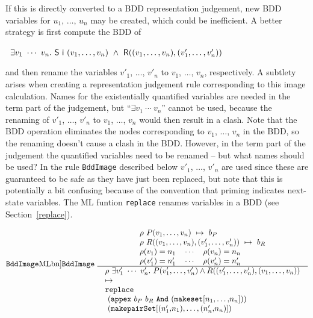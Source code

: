 \documentclass[12pt]{article}
\newcommand{\bnind}[1]{\index[MLbn]{#1}}
\newcommand{\con}[1]{\mbox{\sf #1}}
\newcommand{\ml}[1]{{\tt #1}}
\newcommand{\termbdd}[3]{\mbox{$#1~#2~\mapsto~#3$}}
\begin{document}
\smallskip

If this is directly converted to a BDD representation judgement, new BDD variables for
$u_1$, $\ldots$, $u_n$ may be created, which could be inefficient. A better strategy is
first compute the BDD of

\smallskip

~$\exists v_1~\cdots~v_n.
    ~\con{S}~\con{i}~(v_1,\ldots,v_n)~\wedge~\con{R}((v_1,\ldots,v_n),(v'_1,\ldots,v'_n))$

\smallskip

and then rename the variables $v'_1$, $\ldots$, $v'_n$ to $v_1$,
$\ldots$, $v_n$, respectively. A subtlety arises when creating a
representation judgement rule corresponding to this image
calculation. Names for the existentially quantified variables are
needed in the term part of the judgement, but ``$\exists v_1~\cdots~v_n$''
cannot be used, because the renaming of $v'_1$, $\ldots$, $v'_n$ to
$v_1$, $\ldots$, $v_n$ would then result in a clash. Note that the BDD
operation eliminates the nodes corresponding to $v_1$, $\ldots$, $v_n$
in the BDD, so the renaming doesn't cause a clash in the BDD. However,
in the term part of the judgement the quantified variables need to be
renamed -- but what names should be used? In the rule \ml{BddImage}
described below $v'_1$, $\ldots$, $v'_n$ are used since these are
guaranteed to be safe as they have just been replaced, but note that
this is potentially a bit confusing because of the convention that
priming indicates next-state variables. The ML funtion
\ml{replace} renames variables in a BDD (see Section~\ref{replace}).


\smallskip


$\raisebox{3mm}{\ml{BddImage}\bnind{\ml{BddImage}}}~\begin{array}{c}
\begin{array}{l}
\termbdd{\rho}{P(v_1,\ldots,v_n)}{b_P} \\
\termbdd{\rho}{R((v_1,\ldots,v_n),(v'_1,\ldots,v'_n))}{b_R}\\
\rho(v_1)=n_1 \quad \cdots \quad \rho(v_n)=n_n\\
\rho(v'_1)=n'_1 \quad \cdots \quad \rho(v'_n)=n'_n
\end{array}
\\ \hline
\begin{array}{l}
{\rho}~
{\exists v'_1~\cdots~v'_n.~ P(v'_1,\ldots,v'_n) \wedge R((v'_1,\ldots,v'_n),(v_1,\ldots,v_n))}\\
\mapsto\\
\ml{replace}\\
~(\ml{appex}~b_P~b_R~\ml{And}~\ml{(makeset[}n_1\ml{,}\ldots\ml{,}n_n\ml{])})\\
~(\ml{makepairSet[(}n'_1\ml{,}n_1\ml{),}\ldots\ml{,(}n'_n\ml{,}n_n\ml{)]})
\end{array}
\end{array}$
\end{document}
